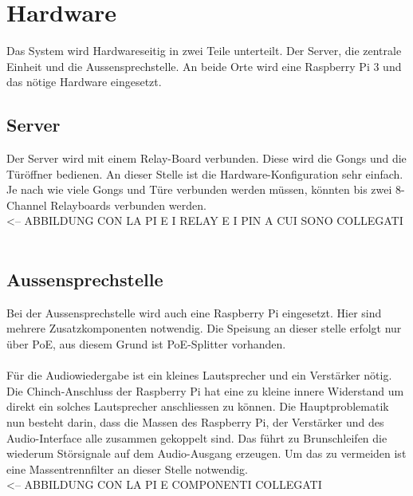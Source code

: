 \section{Hardware}
\label{sec:chapterexample}

Das System wird Hardwareseitig in zwei Teile unterteilt. Der Server, die zentrale Einheit und die Aussensprechstelle. An beide Orte wird eine Raspberry Pi 3 und das nötige Hardware eingesetzt.

\subsection{Server}
\label{sec:chapterexample}

Der Server wird mit einem Relay-Board verbunden. Diese wird die Gongs und die Türöffner bedienen. An dieser Stelle ist die Hardware-Konfiguration sehr einfach. Je nach wie viele Gongs und Türe verbunden werden müssen, könnten bis zwei 8-Channel Relayboards verbunden werden.
\\

<-- ABBILDUNG CON LA PI E I RELAY E I PIN A CUI SONO COLLEGATI
\\
\\

\subsection{Aussensprechstelle}
\label{sec:chapterexample}

Bei der Aussensprechstelle wird auch eine Raspberry Pi eingesetzt. Hier sind mehrere Zusatzkomponenten notwendig. Die Speisung an dieser stelle erfolgt nur über PoE, aus diesem Grund ist PoE-Splitter vorhanden.
\\
\\
Für die Audiowiedergabe ist ein kleines Lautsprecher und ein Verstärker nötig. Die Chinch-Anschluss der Raspberry Pi hat eine zu kleine innere Widerstand um direkt ein solches Lautsprecher anschliessen zu können. Die Hauptproblematik nun besteht darin, dass die Massen des Raspberry Pi, der Verstärker und des Audio-Interface alle zusammen gekoppelt sind. Das führt zu Brunschleifen die wiederum Störsignale auf dem Audio-Ausgang erzeugen. Um das zu vermeiden ist eine Massentrennfilter an dieser Stelle notwendig.
\\

<-- ABBILDUNG CON LA PI E COMPONENTI COLLEGATI
\\
\\

\newpage